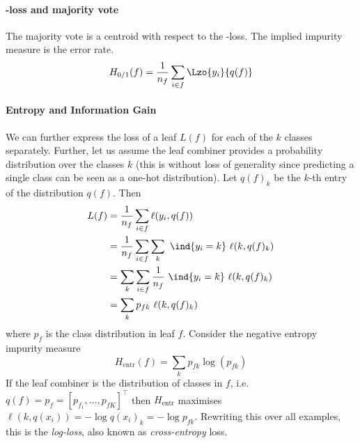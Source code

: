 \documentclass[../main.tex]{subfiles}
\begin{document}
\paragraph{\zeroone-loss and majority vote} The majority vote is a centroid with respect to the \zeroone-loss. The implied impurity measure is the error rate.
$$
H_{0/1}(f) = \frac{1}{n_{f}} \sum_{i \in f} \Lzo{y_{i}}{q(f)}
$$

\paragraph{Entropy and Information Gain} We can further express the loss of a leaf $L(f)$ for each of the $k$ classes  separately. Further, let us assume the leaf combiner provides a probability distribution over the classes $k$ (this is without loss of generality since predicting a single class can be seen as a one-hot distribution). Let $q(f)_{k}$ be the $k$-th entry of the distribution $q(f)$. Then
\begin{align}
\begin{split}
\label{eq:leaf-loss-per-class}
L(f) &= \frac{1}{n_{f}} \sum_{i \in f} \ell(y_{i}, q(f)) \\
&= \frac{1}{n_{f}} \sum_{i\in f} \sum_{k} ~\ind{y_{i} = k} ~\ell(k, q(f)_{k}) \\
&= \sum_{k} \sum_{i \in f} \frac{1}{n_{f}} ~\ind{y_{i} = k} ~ \ell(k, q(f)_{k}) \\
&= \sum_{k} p_{fk} ~ \ell(k, q(f)_{k})
\end{split}
\end{align}
where $p_f$ is the class distribution in leaf $f$.
Consider the negative entropy impurity measure
$$
H_{\text{entr} }(f)  = \sum_{k} p_{fk} \log(p_{fk})
$$
If the leaf combiner is the distribution of classes in $f$, i.e. $q(f) = p_{f} = [p_{f_{1}}, \dots, p_{fK}]^\top$ then $H_{\text{entr}}$ maximises $\ell(k, q(x_{i})) = - \log q(x_{i})_{k} = -\log p_{fk}$. Rewriting this over all examples, this is the \textit{log-loss}, also known as \textit{cross-entropy} loss.
\end{document}
